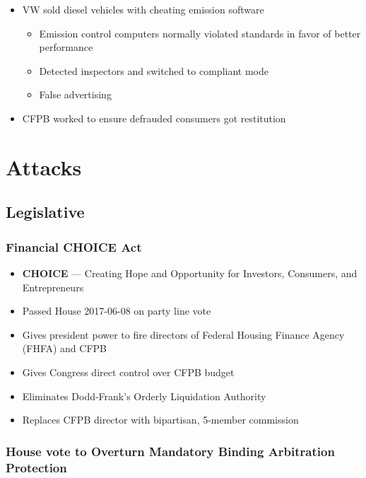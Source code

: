 \documentclass[11pt]{article}
\begin{document}
\begin{itemize}
\item VW sold diesel vehicles with cheating emission software
\begin{itemize}
\item Emission control computers normally violated standards in favor of better performance
\item Detected inspectors and switched to compliant mode
\item False advertising
\end{itemize}
\item CFPB worked to ensure defrauded consumers got restitution
\end{itemize}

\section{Attacks}
\label{sec:org20cdba1}

\subsection{Legislative}
\label{sec:orgc77a701}

\subsubsection{Financial CHOICE Act}
\label{sec:orge42bbf5}

\begin{itemize}
\item \textbf{CHOICE} --- Creating Hope and Opportunity for Investors, Consumers, and Entrepreneurs
\item Passed House 2017-06-08 on party line vote
\item Gives president power to fire directors of Federal Housing Finance Agency (FHFA) and CFPB
\item Gives Congress direct control over CFPB budget
\item Eliminates Dodd-Frank's Orderly Liquidation Authority
\item Replaces CFPB director with bipartisan, 5-member commission
\end{itemize}

\subsubsection{House vote to Overturn Mandatory Binding Arbitration Protection}
\label{sec:org31b9722}
\end{document}
